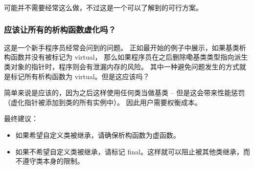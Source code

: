 \documentclass[../../LearnCpp.tex]{subfiles}
\begin{document}
可能并不需要经常这么做，不过这是一个可以了解到的可行方案。

\subsubsection*{应该让所有的析构函数虚化吗？}

这是一个新手程序员经常会问到的问题。
正如最开始的例子中展示，如果基类析构函数并没有被标记为 virtual，
那么如果程序员在之后删除嘞基类类型指向派生类对象的指针时，程序则会有泄漏内存的风险。
其中一种避免问题发生的方式就是标记所有析构函数为 virtual。但是这应该吗？

简单来说是应该的，因为之后这样使用任何类当做基类 --
但是这会带来性能惩罚（虚化指针被添加到类的所有实例中）。
因此用户需要权衡成本。

最终建议：

\begin{itemize}
    \item 如果希望自定义类被继承，请确保析构函数为虚函数。
    \item 如果不希望自定义类被继承，请标记 final。这样就可以阻止被其他类继承，而不遵守类本身的限制。
\end{itemize}
\end{document}
